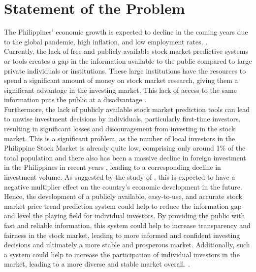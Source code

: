 \section{Statement of the Problem}
\label{sec:problem}
The Philippines' economic growth is expected to decline in the coming 
years due to the global pandemic, high inflation, and low employment rates. 
\cite{Alegado2022,Canto2022,Reuters2022}.
\hfill \\

Currently, the lack of free and publicly available stock market predictive systems or
 tools creates a gap in the information available to the public compared to large private 
 individuals or institutions. These large institutions have the resources to spend a significant 
 amount of money on stock market research, giving them a significant advantage in the investing 
 market. This lack of access to the same information puts the public at a disadvantage
 \cite{Kim2022}. 
 \hfill \\
 
Furthermore, the lack of publicly available stock market prediction tools can 
lead to unwise investment decisions by individuals, particularly first-time investors, 
resulting in significant losses and discouragement from investing in the stock market. 
This is a significant problem, as the number of local investors in the Philippine Stock Market 
is already quite low, comprising only around 1\% of 
the total population and there also has been a massive decline in foreign investment
 in the Philippines in recent years 
 \cite{BusinessWorld2022}, 
 leading to a corresponding decline in investment volume. 
 As suggested by the study of , 
 this is expected to have a negative multiplier effect on the country's 
 economic development in the future. 
 \hfill \\
 
 Hence, the development of a publicly available, easy-to-use, and
 accurate stock market price trend prediction system could help to 
 reduce the information gap and level the playing field for individual investors. 
 By providing the public with fast and reliable information, this system could help to
  increase transparency and fairness in the stock market, leading to more informed 
  and confident investing decisions and ultimately a more stable and prosperous market.
   Additionally, such a system could help to increase the participation of individual 
   investors in the market, leading to a more diverse and stable market overall.
\cite{Statista2022,POPCOMM2021}.
\hfill \\

